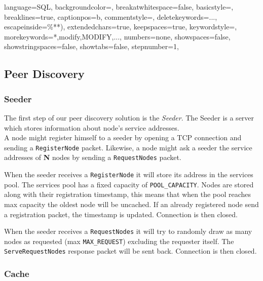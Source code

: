 \documentclass[../documentation.tex]{subfiles}
\begin{document}
 {
    language=SQL,
  	backgroundcolor=\color{lightgray},
  	breakatwhitespace=false,
    basicstyle=\footnotesize,
  	breaklines=true,
  	captionpos=b,
    commentstyle=\color{dkgreen},
  	deletekeywords={...},
  	escapeinside={\%*}{*)},
  	extendedchars=true,
  	keepspaces=true,
  	keywordstyle=\color{blue},
  	morekeywords={*,modify,MODIFY,...},
  	numbers=none,
  	showspaces=false,
  	showstringspaces=false, 
  	showtabs=false,
  	stepnumber=1,
}

\newcommand{\paragraphln}[1]{\paragraph{#1}\mbox{}\\}

\subsection{Peer Discovery}

\subsubsection{Seeder}

The first step of our peer discovery solution is the \textit{Seeder}.
The Seeder is a server which stores information about node's service addresses.
\\
A node might register himself to a seeder by opening a TCP connection and sending
a \texttt{RegisterNode} packet.
Likewise, a node might ask a seeder the service addresses of \textbf{N} nodes by sending a
\texttt{RequestNodes} packet.

When the seeder receives a \texttt{RegisterNode} it will store its address in the
services pool. The services pool has a fixed capacity of \texttt{POOL\_CAPACITY}.
Nodes are stored along with their registration timestamp, this means that when the pool
reaches max capacity the oldest node will be uncached. If an already registered node
send a registration packet, the timestamp is updated.
Connection is then closed.

When the seeder receives a \texttt{RequestNodes} it will try to randomly draw
as many nodes as requested (max \texttt{MAX\_REQUEST}) excluding the requester itself.
The \texttt{ServeRequestNodes} response packet will be sent back.
Connection is then closed.

\subsubsection{Cache}
\end{document}
